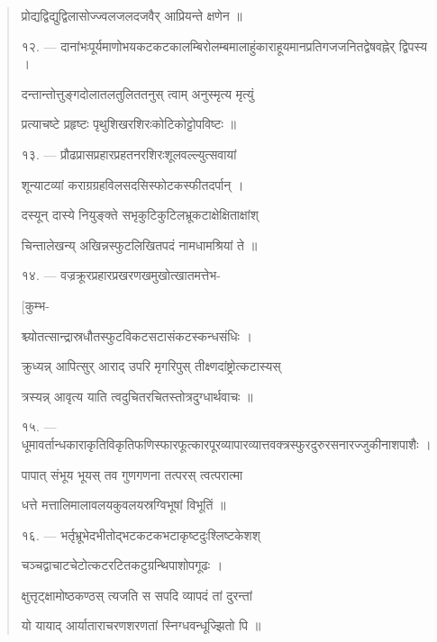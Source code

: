 \documentclass[a4paper, 11pt, oneside, french, landscape, twocolumn]{article}
\begin{document}
\begin{quotation}
\texthindi{प्रोद्यद्विद्युद्विलासोज्ज्वलजलदजवैर् आप्रियन्ते क्षणेन ॥}

\bigskip

\texthindi{१२}. --- \texthindi{दानांभःपूर्यमाणोभयकटकटकालम्बिरोलम्बमालाहुंकाराहूयमानप्रतिगजजनितद्वेषवह्नेर् द्विपस्य ।}

\texthindi{दन्तान्तोत्तुङ्गदोलातलतुलिततनुस् त्वाम् अनुस्मृत्य मृत्युं}

\texthindi{प्रत्याचष्टे प्रहृष्टः पृथुशिखरशिरःकोटिकोट्टोपविष्टः ॥}

\bigskip

\texthindi{१३}. --- \texthindi{प्रौढप्रासप्रहारप्रहतनरशिरःशूलवल्ल्युत्सवायां}

\texthindi{शून्याटव्यां कराग्रग्रहविलसदसिस्फोटकस्फीतदर्पान् ।}

\texthindi{दस्यून् दास्ये नियुङ्क्ते सभृकुटिकुटिलभ्रूकटाक्षेक्षिताक्षांश्}

\texthindi{चिन्तालेखन्य् अखिन्नस्फुटलिखितपदं नामधामश्रियां ते ॥}

\bigskip

\texthindi{१४}. --- \texthindi{वज्रक्रूरप्रहारप्रखरणखमुखोत्खातमत्तेभ-}

\hspace*{55mm}\texthindi{[कुम्भ-}

\texthindi{श्च्योतत्सान्द्रास्रधौतस्फुटविकटसटासंकटस्कन्धसंधिः ।}

\texthindi{क्रुध्यन्न् आपित्सुर् आराद् उपरि मृगरिपुस् तीक्ष्णदांष्ट्रोत्कटास्यस्}

\texthindi{त्रस्यन्न् आवृत्य याति त्वदुचितरचितस्तोत्रदुग्धार्थवाचः ॥}

\bigskip

\texthindi{१५}. --- \texthindi{धूमावर्तान्धकाराकृतिविकृतिफणिस्फारफूत्कारपूरव्यापारव्यात्तवक्त्रस्फुरदुरुरसनारज्जुकीनाशपाशैः ।}

\texthindi{पापात् संभूय भूयस् तव गुणगणना तत्परस् त्वत्परात्मा}

\texthindi{धत्ते मत्तालिमालावलयकुवलयस्रग्विभूषां विभूतिं ॥}

\bigskip

\texthindi{१६}. --- \texthindi{भर्तृभ्रूभेदभीतोद्भटकटकभटाकृष्टदुःश्लिष्टकेशश्}

\texthindi{चञ्चद्वाचाटचेटोत्कटरटितकटुग्रन्थिपाशोपगूढः ।}

\texthindi{क्षुत्तृट्क्षामोष्ठकण्ठस् त्यजति स सपदि व्यापदं तां दुरन्तां}

\texthindi{यो यायाद् आर्याताराचरणशरणतां स्निग्धवन्धूज्झितो पि ॥}

\bigskip


\end{quotation}
\end{document}
